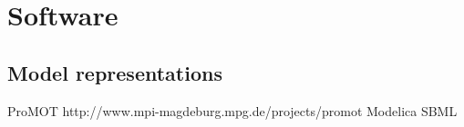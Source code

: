 \chapter{Software}

\section{Model representations}

ProMOT http://www.mpi-magdeburg.mpg.de/projects/promot
Modelica
SBML




